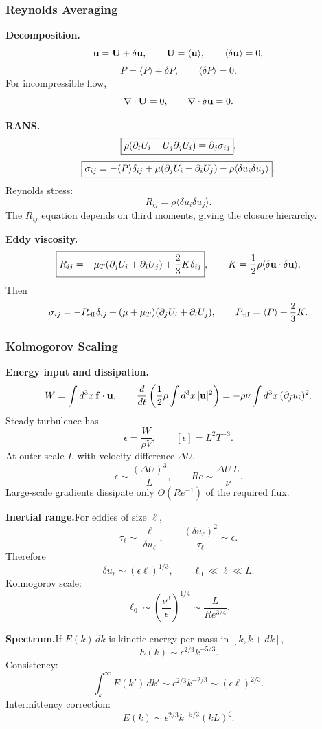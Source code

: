 \subsubsection*{Reynolds Averaging}

\noindent\textbf{Decomposition.}\quad
\[
  \mathbf{u}=\mathbf{U}+\delta\mathbf{u},\qquad
  \mathbf{U}=\langle\mathbf{u}\rangle,\qquad
  \langle\delta\mathbf{u}\rangle=0,
\]
\[
  P=\langle P\rangle+\delta P,\qquad
  \langle\delta P\rangle=0.
\]
For incompressible flow,
\[
  \nabla\cdot\mathbf{U}=0,\qquad \nabla\cdot\delta\mathbf{u}=0.
\]

\noindent\textbf{RANS.}\quad
\[
  \boxed{\rho(\partial_tU_i+U_j\partial_jU_i)=\partial_j\sigma_{ij}},
\]
\[
  \boxed{\sigma_{ij}=-\langle P\rangle\delta_{ij}
  +\mu(\partial_jU_i+\partial_iU_j)
  -\rho\langle\delta u_i\delta u_j\rangle}.
\]
Reynolds stress:
\[
  R_{ij}=\rho\langle\delta u_i\delta u_j\rangle.
\]
The $R_{ij}$ equation depends on third moments, giving the closure hierarchy.

\noindent\textbf{Eddy viscosity.}\quad
\[
  \boxed{R_{ij}=-\mu_T(\partial_jU_i+\partial_iU_j)+\frac23K\delta_{ij}},
  \qquad
  K=\frac{1}{2}\rho\langle\delta\mathbf{u}\cdot\delta\mathbf{u}\rangle.
\]
Then
\[
  \sigma_{ij}=-P_{\rm eff}\delta_{ij}+(\mu+\mu_T)(\partial_jU_i+\partial_iU_j),
  \qquad
  P_{\rm eff}=\langle P\rangle+\frac23K.
\]

\subsubsection*{Kolmogorov Scaling}

\noindent\textbf{Energy input and dissipation.}\quad
\[
  W=\int d^3x\,\mathbf{f}\cdot\mathbf{u},
  \qquad
  \frac{d}{dt}\left(\frac{1}{2}\rho\int d^3x\,|\mathbf{u}|^2\right)
  =-\rho\nu\int d^3x\,(\partial_j u_i)^2.
\]
Steady turbulence has
\[
  \epsilon=\frac{W}{\rho V},
  \qquad
  [\epsilon]=L^2T^{-3}.
\]
At outer scale $L$ with velocity difference $\Delta U$,
\[
  \boxed{\epsilon\sim\frac{(\Delta U)^3}{L}},
  \qquad
  Re\sim\frac{\Delta U\,L}{\nu}.
\]
Large-scale gradients dissipate only $O(Re^{-1})$ of the required flux.

\noindent\textbf{Inertial range.}\quad For eddies of size $\ell$,
\[
  \tau_\ell\sim\frac{\ell}{\delta u_\ell},
  \qquad
  \frac{(\delta u_\ell)^2}{\tau_\ell}\sim\epsilon.
\]
Therefore
\[
  \boxed{\delta u_\ell\sim(\epsilon\ell)^{1/3}},
  \qquad
  \ell_0\ll\ell\ll L.
\]
Kolmogorov scale:
\[
  \boxed{\ell_0\sim\left(\frac{\nu^3}{\epsilon}\right)^{1/4}
  \sim\frac{L}{Re^{3/4}}}.
\]

\noindent\textbf{Spectrum.}\quad If $E(k)\,dk$ is kinetic energy per mass in $[k,k+dk]$,
\[
  \boxed{E(k)\sim\epsilon^{2/3}k^{-5/3}}.
\]
Consistency:
\[
  \int_k^\infty E(k')\,dk'\sim\epsilon^{2/3}k^{-2/3}
  \sim(\epsilon\ell)^{2/3}.
\]
Intermittency correction:
\[
  E(k)\sim\epsilon^{2/3}k^{-5/3}(kL)^\zeta.
\]

